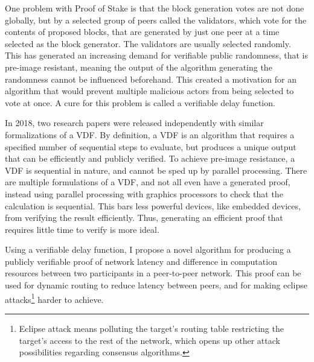 One problem with Proof of Stake is that the block generation votes are not done globally, but by a selected group of peers called the validators, which vote for the contents of proposed blocks, that are generated by just one peer at a time selected as the block generator. The validators are usually selected randomly. This has generated an increasing demand for verifiable public randomness, that is pre-image resistant, meaning the output of the algorithm generating the randomness cannot be influenced beforehand. This created a motivation for an algorithm that would prevent multiple malicious actors from being selected to vote at once. A cure for this problem is called a verifiable delay function.

In 2018, two research papers were released independently with similar formalizations of a VDF.\cite{Wesolowski2018-rf}\cite{Pietrzak2018-xs} By definition, a VDF is an algorithm that requires a specified number of sequential steps to evaluate, but produces a unique output that can be efficiently and publicly verified.\cite{Boneh_undated-ml} To achieve pre-image resistance, a VDF is sequential in nature, and cannot be sped up by parallel processing. There are multiple formulations of a VDF, and not all even have a generated proof, instead using parallel processing with graphics processors to check that the calculation is sequential.\cite{Yakovenko2018-zn} This bars less powerful devices, like embedded devices, from verifying the result efficiently. Thus, generating an efficient proof that requires little time to verify is more ideal.\cite{Boneh_undated-ml}

Using a verifiable delay function, I propose a novel algorithm for producing a publicly verifiable proof of network latency and difference in computation resources between two participants in a peer-to-peer network. This proof can be used for dynamic routing to reduce latency between peers, and for making eclipse attacks\footnote{Eclipse attack means polluting the target's routing table restricting the target's access to the rest of the network, which opens up other attack possibilities regarding consensus algorithms.} harder to achieve.
